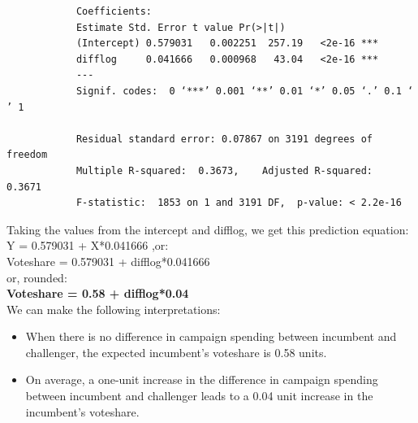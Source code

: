 \documentclass[12pt,letterpaper]{article}
\begin{document}
\begin{enumerate}
\begin{verbatim}
			Coefficients:
			Estimate Std. Error t value Pr(>|t|)    
			(Intercept) 0.579031   0.002251  257.19   <2e-16 ***
			difflog     0.041666   0.000968   43.04   <2e-16 ***
			---
			Signif. codes:  0 ‘***’ 0.001 ‘**’ 0.01 ‘*’ 0.05 ‘.’ 0.1 ‘ ’ 1
			
			Residual standard error: 0.07867 on 3191 degrees of freedom
			Multiple R-squared:  0.3673,	Adjusted R-squared:  0.3671 
			F-statistic:  1853 on 1 and 3191 DF,  p-value: < 2.2e-16
		\end{verbatim}
		Taking the values from the intercept and difflog, we get this prediction equation: \\
		Y = 0.579031 + X*0.041666          ,or:\\
		Voteshare = 0.579031 + difflog*0.041666\\
		or, rounded: \\
		\textbf{Voteshare = 0.58 + difflog*0.04}	\\
		
		We can make the following interpretations:
		\begin{itemize}
			\item When there is no difference in campaign spending between incumbent and challenger, the expected incumbent's voteshare is 0.58 units.
			\item On average, a one-unit increase in the difference in campaign spending between incumbent and challenger leads to a 0.04 unit increase in the incumbent's voteshare.
		\end{itemize}
		
		
		
	\end{enumerate}
	
\newpage
\end{document}
